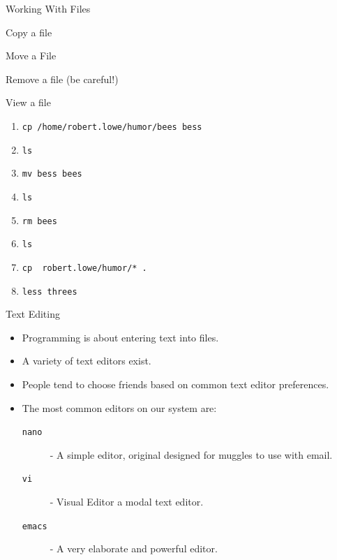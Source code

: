 \documentclass{beamer}
\begin{document}
\begin{frame}{Working With Files}
\begin{description}[<+->]
    \item[{\tt cp} {\em src dest}] Copy a file
    \item[{\tt mv} {\em src dest}] Move a File
    \item[{\tt rm} {\em filename}] Remove a file (be careful!)
    \item[{\tt less} {\em filename}] View a file
\end{description}

\begin{enumerate}[<+->]
    \item {\tt cp /home/robert.lowe/humor/bees bess}
    \item {\tt ls}
    \item {\tt mv bess bees}
    \item {\tt ls}
    \item {\tt rm bees}
    \item {\tt ls}
    \item {\tt cp ~robert.lowe/humor/* .}
    \item {\tt less threes}
\end{enumerate}
\end{frame}


\begin{frame}{Text Editing}
\begin{itemize}[<+->]
    \item Programming is about entering text into files.
    \item A variety of text editors exist.
    \item People tend to choose friends based on common text editor
    preferences.
    \item The most common editors on our system are:
    \begin{description}
        \item[{\tt nano}] - A simple editor, original designed for
        muggles to use with email.
        \item[{\tt vi}] - Visual Editor a modal text editor.
        \item[{\tt emacs}] - A very elaborate and powerful editor.
    \end{description}
\end{itemize}
\end{frame}
\end{document}
